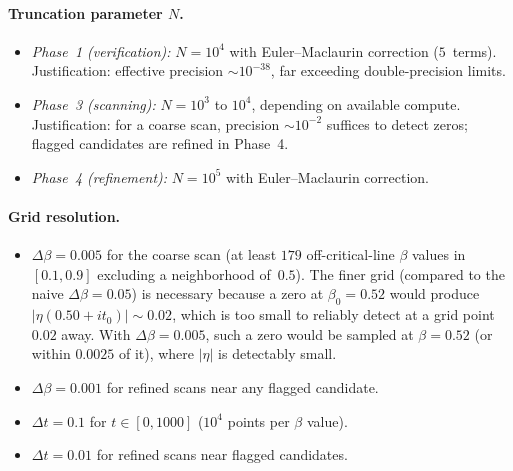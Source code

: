 \paragraph{Truncation parameter $N$.}
\begin{itemize}
  \item \emph{Phase~1 (verification):} $N = 10^4$ with Euler--Maclaurin correction
        ($5$~terms). Justification: effective precision $\sim 10^{-38}$, far exceeding
        double-precision limits.
  \item \emph{Phase~3 (scanning):} $N = 10^3$ to $10^4$, depending on available compute.
        Justification: for a coarse scan, precision $\sim 10^{-2}$ suffices to detect
        zeros; flagged candidates are refined in Phase~4.
  \item \emph{Phase~4 (refinement):} $N = 10^5$ with Euler--Maclaurin correction.
\end{itemize}

\paragraph{Grid resolution.}
\begin{itemize}
  \item $\Delta\beta = 0.005$ for the coarse scan (at least $179$ off-critical-line
        $\beta$ values in $[0.1, 0.9]$ excluding a neighborhood of~$0.5$). The finer
        grid (compared to the naive $\Delta\beta = 0.05$) is necessary because a zero at
        $\beta_0 = 0.52$ would produce $|\eta(0.50 + it_0)| \sim 0.02$, which is too
        small to reliably detect at a grid point $0.02$ away. With $\Delta\beta = 0.005$,
        such a zero would be sampled at $\beta = 0.52$ (or within $0.0025$ of it), where
        $|\eta|$ is detectably small.
  \item $\Delta\beta = 0.001$ for refined scans near any flagged candidate.
  \item $\Delta t = 0.1$ for $t \in [0, 1000]$ ($10^4$ points per $\beta$ value).
  \item $\Delta t = 0.01$ for refined scans near flagged candidates.
\end{itemize}

